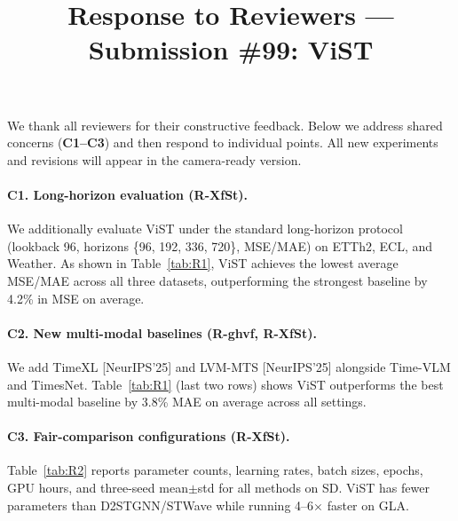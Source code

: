 \documentclass[9pt,twocolumn,letterpaper]{article}
\begin{document}
\title{Response to Reviewers --- Submission \#99: ViST}

\maketitle
\thispagestyle{empty}
\appendix

\noindent We thank all reviewers for their constructive feedback. Below we address shared concerns (\textbf{C1--C3}) and then respond to individual points. All new experiments and revisions will appear in the camera-ready version.

\vspace{-0.5em}
\paragraph{C1. Long-horizon evaluation (R-XfSt).}
We additionally evaluate ViST under the standard long-horizon protocol (lookback 96, horizons \{96, 192, 336, 720\}, MSE/MAE) on ETTh2, ECL, and Weather. As shown in Table~\ref{tab:R1}, ViST achieves the lowest average MSE/MAE across all three datasets, outperforming the strongest baseline by 4.2\% in MSE on average.

\vspace{-0.5em}
\paragraph{C2. New multi-modal baselines (R-ghvf, R-XfSt).}
We add TimeXL [NeurIPS'25] and LVM-MTS [NeurIPS'25] alongside Time-VLM and TimesNet. Table~\ref{tab:R1} (last two rows) shows ViST outperforms the best multi-modal baseline by 3.8\% MAE on average across all settings.

\vspace{-0.5em}
\paragraph{C3. Fair-comparison configurations (R-XfSt).}
Table~\ref{tab:R2} reports parameter counts, learning rates, batch sizes, epochs, GPU hours, and three-seed mean$\pm$std for all methods on SD. ViST has fewer parameters than D2STGNN/STWave while running 4--6$\times$ faster on GLA.
\end{document}
